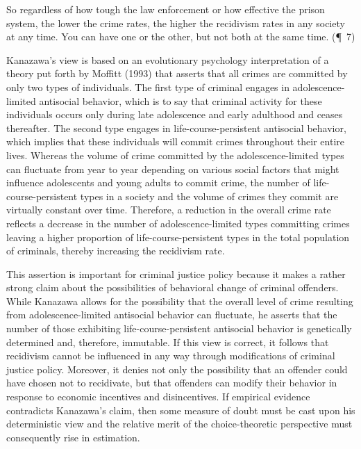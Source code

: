 \bigskip

\noindent \hspace{1cm} \parbox{13cm}{So regardless of how tough the law enforcement or how effective the prison system, the lower the crime rates, the higher the recidivism rates in any society at any time. You can have one or the other, but not both at the same time. (\P \ 7)}

\bigskip


Kanazawa's view is based on an evolutionary psychology interpretation of a theory put forth by Moffitt (1993) that asserts that all crimes are committed by only two types of individuals.  The first type of criminal engages in adolescence-limited antisocial behavior, which is to say that criminal activity for these individuals occurs only during late adolescence and early adulthood and ceases thereafter.  The second type engages in life-course-persistent antisocial behavior, which implies that these individuals will commit crimes throughout their entire lives.  Whereas the volume of crime committed by the adolescence-limited types can fluctuate from year to year depending on various social factors that might influence adolescents and young adults to commit crime, the number of life-course-persistent types in a society and the volume of crimes they commit are virtually constant over time.  Therefore, a reduction in the overall crime rate reflects a decrease in the number of adolescence-limited types committing crimes leaving a higher proportion of life-course-persistent types in the total population of criminals, thereby increasing the recidivism rate.

This assertion is important for criminal justice policy because it makes a rather strong claim about the possibilities of behavioral change of criminal offenders.  While Kanazawa allows for the possibility that the overall level of crime resulting from adolescence-limited antisocial behavior can fluctuate, he asserts that the number of those exhibiting life-course-persistent antisocial behavior is genetically determined and, therefore, immutable.  If this view is correct, it follows that recidivism cannot be influenced in any way through modifications of criminal justice policy.  Moreover, it denies not only the possibility that an offender could have chosen not to recidivate, but that offenders can modify their behavior in response to economic incentives and disincentives.  If empirical evidence contradicts Kanazawa's claim, then some measure of doubt must be cast upon his deterministic view and the relative merit of the choice-theoretic perspective must consequently rise in estimation.

